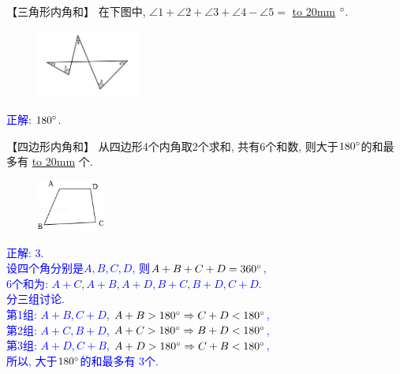 \item {
    【三角形内角和】
    {在下图中, $\angle 1 + \angle 2 + \angle 3 + \angle 4 - \angle 5=$ \underline{\hbox to 20mm{}} $\degree$.} 
    \begin{figure}[H] 
        \centering
        \includegraphics[width=0.3\textwidth]{./pics/Chapter_2/9.png}
    \end{figure}
    \ifshowSolution 
        \fangsong{}\textcolor{blue}{
            正解: $180\degree$. \\
        }
    \else
        \vspace{1cm}
    \fi
}

\item {
    【四边形内角和】
    从四边形4个内角取2个求和, 共有6个和数, 则大于$180\degree$的和最多有 \underline{\hbox to 20mm{}} 个.
    \begin{figure}[H] 
        \centering
        \includegraphics[width=0.2\textwidth]{./pics/Chapter_2/11.png}
    \end{figure}
    \ifshowSolution 
        \fangsong{}\textcolor{blue}{
            正解: 3.\\
            设四个角分别是$A,B,C,D$, 则$A+B+C+D = 360\degree$, \\
            6个和为: $A+C, A+B, A+D, B+C, B+D, C+D$. \\
            分三组讨论.\\
            第1组: $A+B, C+D$, $A+B > 180\degree \Rightarrow C+D < 180\degree$, \\
            第2组: $A+C,B+D$, $A+C > 180\degree \Rightarrow B+D < 180\degree$, \\
            第3组: $A+D,C+B$, $A+D > 180\degree \Rightarrow C+B < 180\degree$, \\
            所以, 大于$180\degree$的和最多有 3个.
        }
    \else
        \vspace{1cm}
    \fi
}

